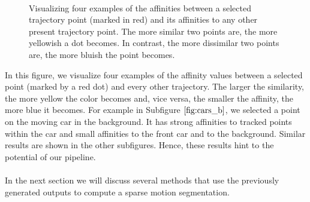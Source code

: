 \begin{figure}[H]
\begin{center}
~
\end{center}
\caption[Trajectory Affinities Example]{Visualizing four examples of the affinities between a selected trajectory point (marked in red) and its affinities to any other present trajectory point. The more similar two points are, the more yellowish a dot becomes. In contrast, the more dissimilar two points are, the more bluish the point becomes.}
\label{fig:cars_affinities}
\end{figure}
In this figure, we visualize four examples of the affinity values between a selected point (marked by a red dot) and every other trajectory. The larger the similarity, the more yellow the color becomes and, vice versa, the smaller the affinity, the more blue it becomes. For example in Subfigure $\ref{fig:cars_b}$, we selected a point on the moving car in the background. It has strong affinities to tracked points within the car and small affinities to the front car and to the background. Similar results are shown in the other subfigures. Hence, these results hint to the potential of our pipeline. \\ \\
In the next section we will discuss several methods that use the previously generated outputs to compute a sparse motion segmentation.

